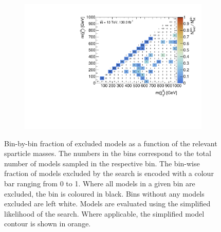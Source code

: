 \begin{figure}
\begin{subfigure}[b]{0.5\linewidth}
	\end{subfigure}\hfill
	\par\medskip
	\begin{subfigure}[b]{0.5\linewidth}
		\centering\includegraphics[width=\textwidth]{cut_none/mchi1p_mchi20_contour}
		\caption{\label{fig:mchi1p_mchi20_contour}}
	\end{subfigure}\hfill
	\caption{Bin-by-bin fraction of excluded models as a function of the relevant sparticle masses. The numbers in the bins correspond to the total number of models sampled in the respective bin. The bin-wise fraction of models excluded by the \onelepton search is encoded with a colour bar ranging from 0 to 1. Where all models in a given bin are excluded, the bin is coloured in black. Bins without any models excluded are left white. Models are evaluated using the simplified likelihood of the \onelepton search. Where applicable, the simplified model contour is shown in orange.}
	\label{fig:impact_electroweakinos_2D}
\end{figure}


